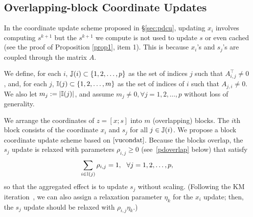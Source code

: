 {{\subsection{Overlapping-block Coordinate Updates}\label{sec:overlap}
{In the coordinate update scheme proposed in \S\ref{sec:pdcu}, updating $x_i$ involves computing $s^{k+1}$ but the $s^{k+1}$ we compute is not used to update $s$ or even cached (see the proof of Proposition \ref{prop1}, item 1). This is because $x_i$'s and $s_j$'s are coupled through the matrix $A$.

We define, for each $i$,  $\mathbb{J}(i)\subset \{1,2,\ldots, p\}$ as the set of indices $ j$ such that $A^\top_{i,j}\neq 0$, and, for each $j$,  $\mathbb{I}(j)\subset\{1,2,\ldots,m\}$ as the set of indices of $i$ such that $A_{j,i}\neq 0$. We also let $m_j:=|\mathbb{I}(j)|$, and assume $m_j\neq 0,\forall j=1,2,\ldots, p$ without loss of generality.

We arrange the coordinates of $z=[x;s]$ into $m$ (overlapping) blocks. The $i$th block consists of the coordinate $x_i$ and  $s_j$ for all $j\in\mathbb{J}(i)$. We propose a block coordinate update scheme based on $\eqref{vucondat}$. Because the blocks overlap, the $s_j$ update is relaxed with parameters $\rho_{i,j}\ge 0$ (see~\eqref{pdoverlap} below) that satisfy  $$\sum_{i\in \mathbb{I}(j)}\rho_{i,j}=1,~~\forall j=1,2,\ldots, p,$$ so that the aggregated effect is to update $s_j$ without scaling. (Following the
KM iteration~\cite{krasnosel1955two}, we can also assign a relaxation parameter $\eta_k$ for the $x_i$ update; then, the $s_j$ update should be relaxed with $\rho_{i,j}\eta_k$.)

}}}
